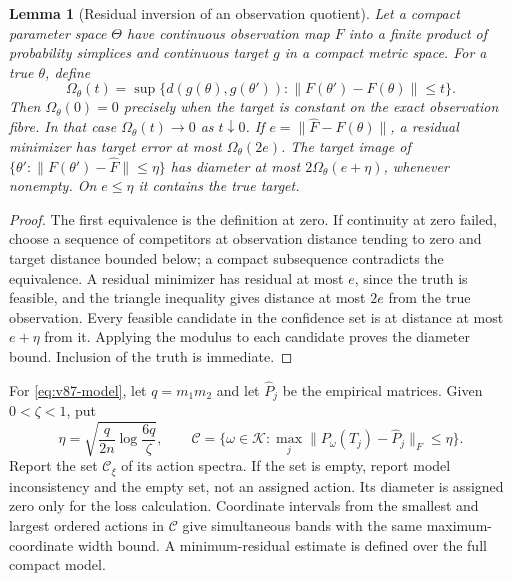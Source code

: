 \documentclass[11pt,reqno]{amsart}
\numberwithin{equation}{section}
\newtheorem{lemma}[theorem]{Lemma}
\theoremstyle{definition}\newtheorem{definition}[theorem]{Definition}
\theoremstyle{remark}\newtheorem{remark}[theorem]{Remark}
\newcommand{\cK}{\mathcal K}
\newcommand{\cC}{\mathcal C}
\begin{document}
\begin{lemma}[Residual inversion of an observation quotient]
\label{lem:v87-modulus}
Let a compact parameter space $\Theta$ have continuous observation map
$F$ into a finite product of probability simplices and continuous target
$g$ in a compact metric space. For a true $\theta$, define
\[
 \Omega_\theta(t)=\sup\{d(g(\theta),g(\theta')):
                                  \|F(\theta')-F(\theta)\|\le t\}.
\]
Then $\Omega_\theta(0)=0$ precisely when the target is constant on
the exact observation fibre. In that case $\Omega_\theta(t)\to0$
as $t\downarrow0$. If $e=\|\widehat F-F(\theta)\|$, a residual
minimizer has target error at most $\Omega_\theta(2e)$.
The target image of $\{\theta':\|F(\theta')-\widehat F\|\le\eta\}$
has diameter at most $2\Omega_\theta(e+\eta)$, whenever nonempty.
On $e\le\eta$ it contains the true target.
\end{lemma}
\begin{proof}
The first equivalence is the definition at zero. If continuity at
zero failed, choose a sequence of competitors at observation distance
tending to zero and target distance bounded below; a compact
subsequence contradicts the equivalence. A residual minimizer has
residual at most $e$, since the truth is feasible, and the triangle
inequality gives distance at most $2e$ from the true observation.
Every feasible candidate in the confidence set is at distance at most
$e+\eta$ from it. Applying the modulus to each candidate proves
the diameter bound. Inclusion of the truth is immediate.
\end{proof}

For \eqref{eq:v87-model}, let $q=m_1m_2$ and let $\widehat P_j$
be the empirical matrices. Given $0<\zeta<1$, put
\begin{equation}\label{eq:v87-radius}
 \eta=\sqrt{\frac{q}{2n}\log\frac{6q}{\zeta}},\qquad
 \cC=\{\omega\in\cK:\max_j\|P_\omega(T_j)-\widehat P_j\|_F\le\eta\}.
\end{equation}
Report the set $\cC_\xi$ of its action spectra. If the set is empty,
report model inconsistency and the empty set, not an assigned action.
Its diameter is assigned zero only for the loss calculation. Coordinate
intervals from the smallest and largest ordered actions in $\cC$
give simultaneous bands with the same maximum-coordinate width bound.
A minimum-residual estimate is defined over the full compact model.
\end{document}
